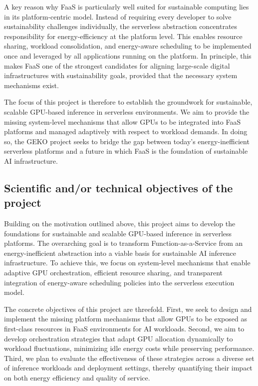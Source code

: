 A key reason why FaaS is particularly well suited for sustainable computing lies in its platform-centric model.
Instead of requiring every developer to solve sustainability challenges individually, the serverless abstraction concentrates responsibility for energy-efficiency at the platform level.
This enables resource sharing, workload consolidation, and energy-aware scheduling to be implemented once and leveraged by all applications running on the platform.
In principle, this makes FaaS one of the strongest candidates for aligning large-scale digital infrastructures with sustainability goals, provided that the necessary system mechanisms exist.

The focus of this project is therefore to establish the groundwork for sustainable, scalable GPU-based inference in serverless environments.
We aim to provide the missing system-level mechanisms that allow GPUs to be integrated into FaaS platforms and managed adaptively with respect to workload demands.
In doing so, the GEKO project seeks to bridge the gap between today's energy-inefficient serverless platforms and a future in which FaaS is the foundation of sustainable AI infrastructure.


\subsection{Scientific and/or technical objectives of the project}

Building on the motivation outlined above, this project aims to develop the foundations for sustainable and scalable GPU-based inference in serverless platforms.
The overarching goal is to transform Function-as-a-Service from an energy-inefficient abstraction into a viable basis for sustainable AI inference infrastructure.
To achieve this, we focus on system-level mechanisms that enable adaptive GPU orchestration, efficient resource sharing, and transparent integration of energy-aware scheduling policies into the serverless execution model.

The concrete objectives of this project are threefold.
First, we seek to design and implement the missing platform mechanisms that allow GPUs to be exposed as first-class resources in FaaS environments for AI workloads.
Second, we aim to develop orchestration strategies that adapt GPU allocation dynamically to workload fluctuations, minimizing idle energy costs while preserving performance.
Third, we plan to evaluate the effectiveness of these strategies across a diverse set of inference workloads and deployment settings, thereby quantifying their impact on both energy efficiency and quality of service.

